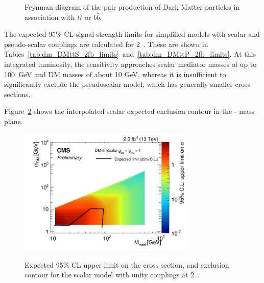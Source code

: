 \begin{figure}[h!] \centering
{}
\caption{Feynman diagram of the pair production of Dark Matter particles in
association with $t\bar{t}$ or $b\bar{b}$. \cite{Abercrombie:2015wmb}}
\label{fig:feynman_hf} \end{figure}


The expected 95\% CL signal strength limits for simplified \DMtt models with scalar and
pseudo-scalar couplings are calculated for 2~\ifb. These are shown in
Tables~\ref{tab:dm_DMttS_2fb_limits}~and~\ref{tab:dm_DMttP_2fb_limits}. At this
integrated luminosity, the sensitivity approaches scalar mediator masses of up 
to 100~GeV and DM masses of about 10 GeV, whereas it is insufficient to
significantly exclude the pseudoscalar model, which has generally smaller cross
sections.

Figure~\ref{fig:dm_DMttS_2fb_2dlimits} shows the interpolated scalar expected 
exclusion contour in the {\mphi-\mchi} mass plane.


\clearpage


\clearpage

\begin{figure}
\begin{center}
\includegraphics[width=0.75\textwidth]{figures/DMplots/dm_DMttS_2p0fb_2dlimits.png} \\
\caption{Expected 95\% CL upper limit on the cross section, and exclusion
contour for the scalar \DMtt model with unity couplings at 2~\ifb.}
\label{fig:dm_DMttS_2fb_2dlimits}
\end{center}
\end{figure}

